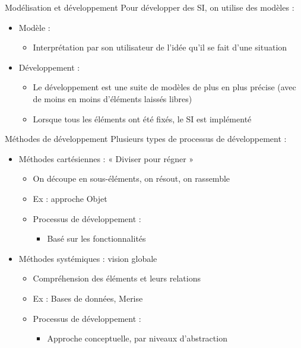 \documentclass[14pt]{beamer}
\begin{document}
\begin{framentitle}{Modélisation et développement}
    Pour développer des SI, on utilise des modèles :
    \begin{itemize}
        \item Modèle :
            \begin{itemize}
                \item Interprétation par son utilisateur de l'idée qu'il se
                    fait d'une situation
            \end{itemize}
        \item Développement :
            \begin{itemize}
                \item Le développement est une suite de modèles de plus en plus
                    précise (avec de moins en moins d'éléments laissés libres)
                \item[\ra] Lorsque tous les éléments ont été fixés, le SI est implémenté
            \end{itemize}
    \end{itemize}
\end{framentitle}

\begin{framentitle}{Méthodes de développement}
    Plusieurs types de processus de développement :
    \begin{itemize}
        \item Méthodes cartésiennes : « Diviser pour régner »
            \begin{itemize}
                \item On découpe en sous-éléments, on résout, on rassemble
                \item Ex : approche Objet
                \item Processus de développement :
                    \begin{itemize}
                        \item Basé sur les fonctionnalités
                    \end{itemize}
            \end{itemize}
        \item Méthodes systémiques : vision globale
            \begin{itemize}
                \item Compréhension des éléments et leurs relations
                \item Ex : Bases de données, Merise
                \item Processus de développement :
                    \begin{itemize}
                        \item Approche conceptuelle, par niveaux d'abstraction
                    \end{itemize}
            \end{itemize}
    \end{itemize}
\end{framentitle}
\end{document}
